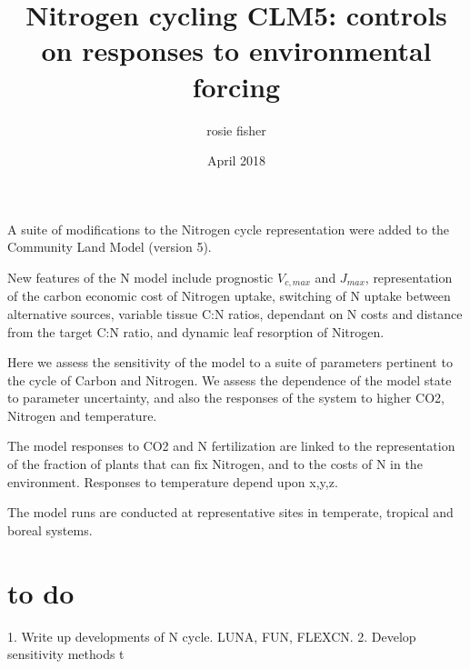 \documentclass[draft,linenumbers]{agujournal}
\begin{document}

\title{Nitrogen cycling CLM5: controls on responses to environmental forcing}
\author{rosie fisher}
\date{April 2018}



\begin{keypoints}
\item A suite of modifications to the Nitrogen cycle representation were added to the Community Land Model (version 5).
\item New features of the N model include prognostic $V_{c,max}$ and $J_{max}$, representation of the carbon economic cost of Nitrogen uptake, switching of N uptake between alternative sources, variable tissue C:N ratios, dependant on N costs and distance from the target C:N ratio, and dynamic leaf resorption of Nitrogen. 
\item Here we assess the sensitivity of the model to a suite of parameters pertinent to the cycle of Carbon and Nitrogen. We assess the dependence of the model state to parameter uncertainty, and also the responses of the system to higher CO2, Nitrogen and temperature.
\item The model responses to CO2 and N fertilization are linked to the representation of the fraction of plants that can fix Nitrogen, and to the costs of N in the environment. Responses to temperature depend upon x,y,z. 
\item The model runs are conducted at representative sites in temperate, tropical and boreal systems. 

\end{keypoints}

\section{to do}
1.	Write up developments of N cycle. LUNA, FUN, FLEXCN. 
2.	Develop sensitivity methods
t
\end{document}
